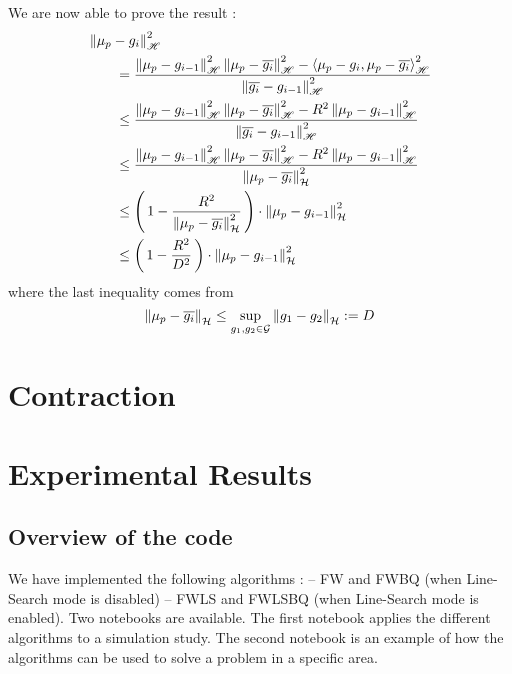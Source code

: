 \begin{boxcomputation}
We are now able to prove the result :
\begin{align*}
&\left\| \mu_p-g_i \right\|_{ \mathscr { H }} ^ { 2 } \\ &\qquad= \frac { \left\| \mu_p-g_{i-1} \right\|_{ \mathscr { H }} ^ { 2 } \left\| \mu_p-\overline{g_i} \right\|_{ \mathscr { H }} ^ { 2 } - \left\langle \mu_p-g_i , \mu_p-\overline{g_i} \right\rangle_{ \mathscr { H }} ^ { 2 } } { \left\| \overline{g_i}-g_{i-1} \right\|_{ \mathscr { H }} ^ { 2 } }\\
&\qquad\leq \frac { \left\| \mu_p-g_{i-1} \right\|_{ \mathscr { H }} ^ { 2 } \left\| \mu_p-\overline{g_i} \right\|_{ \mathscr { H }} ^ { 2 } - R^2 \left\| \mu _ { p } - g _ { i - 1 } \right\| _ { \mathscr { H } }^2 } { \left\| \overline{g_i}-g_{i-1} \right\|_{ \mathscr { H }} ^ { 2 } }\\
&\qquad\leq \frac { \left\| \mu_p-g_{i-1} \right\|_{ \mathscr { H }} ^ { 2 } \left\| \mu_p-\overline{g_i} \right\|_{ \mathscr { H }} ^ { 2 } - R^2 \left\| \mu _ { p } - g _ { i - 1 } \right\| _ { \mathscr { H } }^2 } { \norme{\mu_p-\overline{g_i}}^2 }\\
&\qquad \leq \prt{1-\frac{R^2}{\norme{\mu_p-\overline{g_i}}^2}}\cdot \norme{\mu_p-g_{i-1}}^2\\
&\qquad \leq \prt{1-\frac{R^2}{D^2}}\cdot \norme{\mu_p-g_{i-1}}^2
\end{align*}
where the last inequality comes from
\begin{equation*}
  \norme{\mu_p-\overline{g_i}} \leq \sup_{g_1, g_2 \in \G}   \norme{g_1-g_2} :=D
\end{equation*}
 \end{boxcomputation}

\section{Contraction}
\label{sec:contraction}


\section{Experimental Results}
\label{sec:ER}

\subsection{Overview of the code}

We have implemented the following algorithms : -- FW and FWBQ (when Line-Search mode is disabled) -- FWLS and FWLSBQ (when Line-Search mode is enabled). Two notebooks are available. The first notebook applies the different algorithms to a simulation study. The second notebook is an example of how the algorithms can be used to solve a problem in a specific area.

